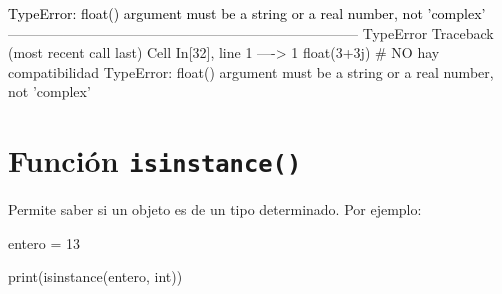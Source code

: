 \documentclass[
  spanish,
  letterpaper,
]{scrbook}
\newenvironment{Shaded}{\begin{snugshade}}{\end{snugshade}}
\newcommand{\BuiltInTok}[1]{\textcolor[rgb]{0.00,0.23,0.31}{#1}}
\newcommand{\DecValTok}[1]{\textcolor[rgb]{0.68,0.00,0.00}{#1}}
\newcommand{\NormalTok}[1]{\textcolor[rgb]{0.00,0.23,0.31}{#1}}
\newcommand{\OperatorTok}[1]{\textcolor[rgb]{0.37,0.37,0.37}{#1}}
\theoremstyle{definition}
\theoremstyle{remark}
\begin{document}
\begin{Highlighting}
\textcolor{black}{TypeError: float() argument must be a string or a real number, not 'complex'}
\textcolor{black}{}\textcolor{QuartoInternalColor1}{---------------------------------------------------------------------------}\textcolor{QuartoInternalColor2}{}
\textcolor{QuartoInternalColor2}{}\textcolor{QuartoInternalColor1}{TypeError}\textcolor{QuartoInternalColor2}{                                 Traceback (most recent call last)}
\textcolor{QuartoInternalColor2}{}\textcolor{QuartoInternalColor3}{Cell}\textcolor{QuartoInternalColor2}{}\textcolor{QuartoInternalColor3}{ }\textcolor{QuartoInternalColor2}{}\textcolor{QuartoInternalColor4}{In[32]}\textcolor{QuartoInternalColor2}{}\textcolor{QuartoInternalColor4}{, line 1}\textcolor{QuartoInternalColor2}{}
\textcolor{QuartoInternalColor2}{}\textcolor{QuartoInternalColor4}{----> }\textcolor{QuartoInternalColor2}{}\textcolor{QuartoInternalColor4}{1}\textcolor{QuartoInternalColor2}{ }\textcolor{QuartoInternalColor5}{float}\textcolor{QuartoInternalColor2}{}\textcolor{QuartoInternalColor2}{(}\textcolor{QuartoInternalColor2}{}\textcolor{QuartoInternalColor2}{3}\textcolor{QuartoInternalColor2}{}\textcolor{QuartoInternalColor2}{+}\textcolor{QuartoInternalColor2}{}\textcolor{QuartoInternalColor2}{3}\textcolor{QuartoInternalColor2}{}\textcolor{QuartoInternalColor2}{j}\textcolor{QuartoInternalColor2}{}\textcolor{QuartoInternalColor2}{)}\textcolor{QuartoInternalColor2}{ }\textcolor{QuartoInternalColor9}{# NO hay compatibilidad}\textcolor{QuartoInternalColor2}{}
\textcolor{QuartoInternalColor2}{}\textcolor{QuartoInternalColor1}{TypeError}\textcolor{QuartoInternalColor2}{: float() argument must be a string or a real number, not 'complex'}
\end{Highlighting}

\section{\texorpdfstring{Función
\texttt{isinstance()}}{Función isinstance()}}\label{funciuxf3n-isinstance}

Permite saber si un objeto es de un tipo determinado. Por ejemplo:

\begin{Shaded}
\begin{Highlighting}[]
\NormalTok{entero }\OperatorTok{=} \DecValTok{13}
\end{Highlighting}
\end{Shaded}

\begin{Shaded}
\begin{Highlighting}[]
\BuiltInTok{print}\NormalTok{(}\BuiltInTok{isinstance}\NormalTok{(entero, }\BuiltInTok{int}\NormalTok{))}
\end{Highlighting}
\end{Shaded}
\end{document}
